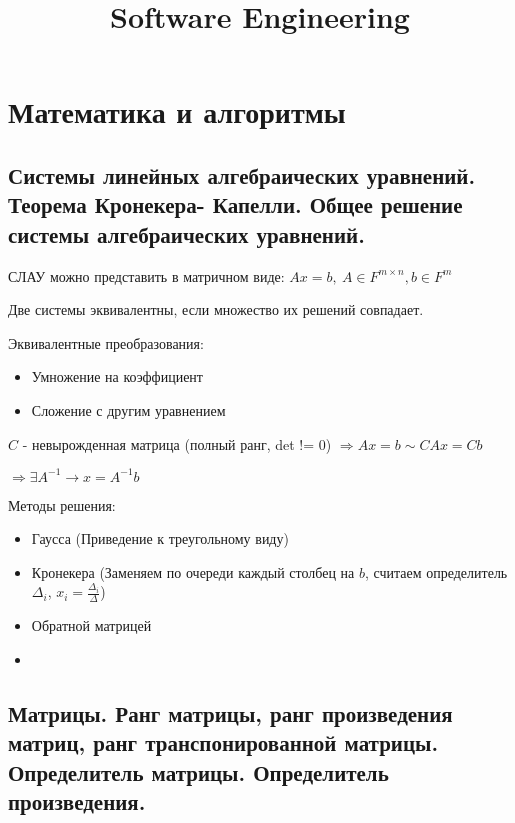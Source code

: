 \documentclass{article}
\title{Software Engineering} %
\begin{document}
\maketitle %

\section{Математика и алгоритмы}

\subsection{Системы линейных алгебраических уравнений. Теорема Кронекера-
Капелли. Общее решение системы алгебраических уравнений.}


СЛАУ можно представить в матричном виде: $Ax = b,\ A \in F^{m\times n}, b \in F^m$

Две системы эквивалентны, если множество их решений совпадает.

Эквивалентные преобразования:
\begin{itemize}
    \item Умножение на коэффициент
    \item Сложение с другим уравнением
\end{itemize}

$C$ - невырожденная матрица (полный ранг, det != 0)
$\Rightarrow Ax = b \sim CA x = C b$

$\Rightarrow \exists A^{-1} \rightarrow x = A^{-1} b$


Методы решения:
\begin{itemize}
    \item Гаусса (Приведение к треугольному виду)
    \item Кронекера (Заменяем по очереди каждый столбец на $b$,
    считаем определитель $\Delta_i$, $x_i = \frac{\Delta_i}{\Delta}$)
    \item Обратной матрицей
    \item 
\end{itemize}


\subsection{Матрицы. Ранг матрицы, ранг произведения матриц, ранг 
транспонированной матрицы. Определитель матрицы. Определитель
произведения.}
\end{document}
